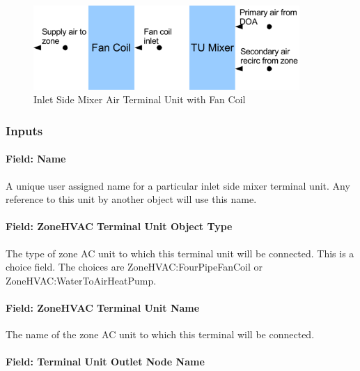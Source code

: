\begin{figure}[hbtp] %
\centering
\includegraphics[width=0.9\textwidth, height=0.9\textheight, keepaspectratio=true]{media/image275.png}
\caption{Inlet Side Mixer Air Terminal Unit with Fan Coil \protect \label{fig:inlet-side-mixer-air-terminal-unit-with-fan}}
\end{figure}

\subsubsection{Inputs}\label{inputs-12-000}

\paragraph{Field: Name}\label{field-name-12}

A unique user assigned name for a particular inlet side mixer terminal unit. Any reference to this unit by another object will use this name.

\paragraph{Field: ZoneHVAC Terminal Unit Object Type}\label{field-zonehvac-terminal-unit-object-type}

The type of zone AC unit to which this terminal unit will be connected. This is a choice field. The choices are ZoneHVAC:FourPipeFanCoil or ZoneHVAC:WaterToAirHeatPump.

\paragraph{Field: ZoneHVAC Terminal Unit Name}\label{field-zonehvac-terminal-unit-name}

The name of the zone AC unit to which this terminal will be connected.

\paragraph{Field: Terminal Unit Outlet Node Name}\label{field-terminal-unit-outlet-node-name}

